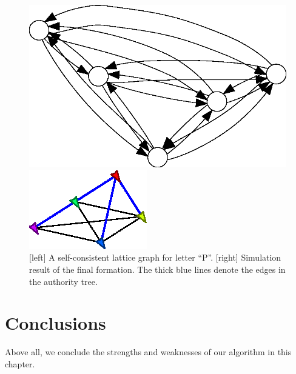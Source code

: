\begin{figure}
    \centering
  \begin{minipage}[b]{0.45\linewidth}
  \includegraphics[width=.9\columnwidth]{figs/pletter}
  \end{minipage}
   \begin{minipage}[b]{0.45\linewidth}
     \includegraphics[width=.9\columnwidth]{figs/p-formation}
   \end{minipage}
   \caption{[left] A self-consistent lattice graph for letter ``P''. [right]
     Simulation result of the final formation. 
     The thick blue lines denote the edges in the authority tree.}
   \label{fig:p-letter}
 \end{figure}
 

\section{Conclusions} 
\label{sec:conc-mrf1}
Above all, we conclude the strengths and weaknesses of our algorithm in this chapter.

